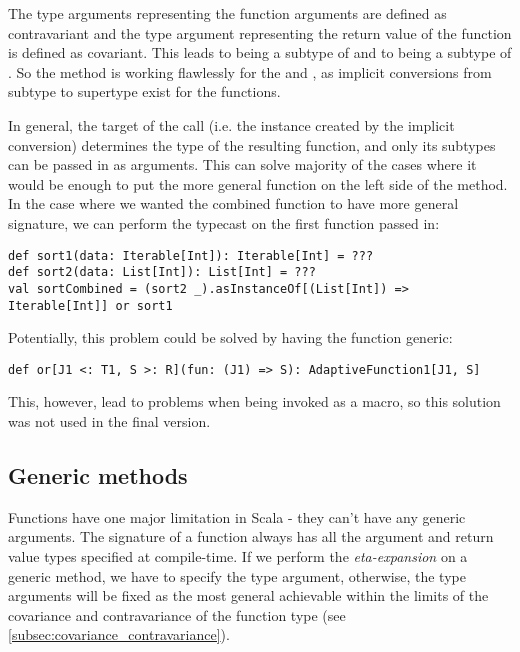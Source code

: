 The type arguments representing the function arguments are defined as contravariant and the type argument representing the return value of the function is defined as covariant. This leads to  being a subtype of  and to  being a subtype of . So the  method is working flawlessly for the  and , as implicit conversions from subtype to supertype exist for the functions.

In general, the target of the  call (i.e. the  instance created by the implicit conversion) determines the type of the resulting function, and only its subtypes can be passed in as arguments. This can solve majority of the cases where it would be enough to put the more general function on the left side of the  method. In the case where we wanted the combined function to have more general signature, we can perform the typecast on the first function passed in:

\lstset{style=Scala}
\begin{lstlisting}
def sort1(data: Iterable[Int]): Iterable[Int] = ???
def sort2(data: List[Int]): List[Int] = ???
val sortCombined = (sort2 _).asInstanceOf[(List[Int]) => Iterable[Int]] or sort1
\end{lstlisting}

Potentially, this problem could be solved by having the  function generic:
\lstset{style=Scala}
\begin{lstlisting}
def or[J1 <: T1, S >: R](fun: (J1) => S): AdaptiveFunction1[J1, S]
\end{lstlisting}
This, however, lead to problems when being invoked as a macro, so this solution was not used in the final version.

\subsection{Generic methods}
\label{subsec:generics}



Functions have one major limitation in Scala - they can't have any generic arguments. The signature of a function always has all the argument and return value types specified at compile-time. If we perform the \textit{eta-expansion} on a generic method, we have to specify the type argument, otherwise, the type arguments will be fixed as the most general achievable within the limits of the covariance and contravariance of the function type (see \ref{subsec:covariance_contravariance}).


